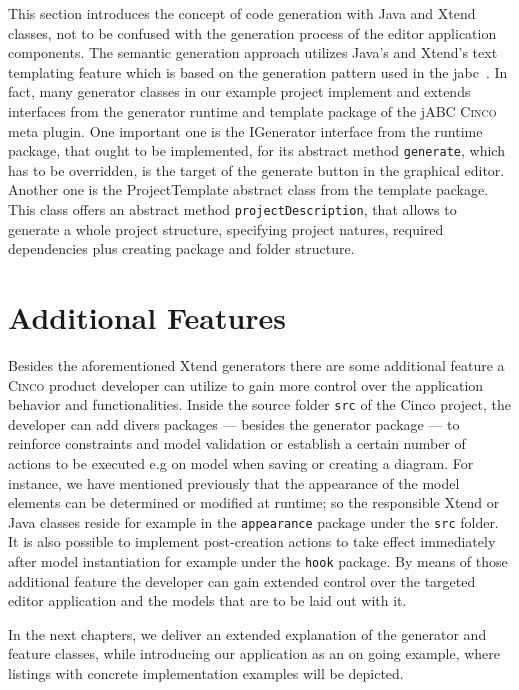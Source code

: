 This section introduces the concept of code generation with Java and Xtend classes, not to be confused with the generation process of the editor application components. The semantic generation approach utilizes Java's and Xtend's text templating feature which is based on the generation pattern used in the \acrfull{jabc}~\cite{model-driver-dev_jABC,jabc-home}. In fact, many generator classes in our example project implement and extends interfaces from the generator runtime and template package of the jABC \textsc{Cinco} meta plugin. One important one is the IGenerator interface from the runtime package, that ought to be implemented, for its abstract method \lstinline{generate}, which has to be overridden, is the target of the generate button in the graphical editor. Another one is the ProjectTemplate abstract class from the template package. This class offers an abstract method \lstinline{projectDescription}, that allows to generate a whole project structure, specifying project natures, required dependencies plus creating package and folder structure.

\section{Additional Features}

Besides the aforementioned Xtend generators there are some additional feature a \textsc{Cinco} product developer can utilize to gain more control over the application behavior and functionalities. Inside the source folder \lstinline{src} of the Cinco project, the developer can add divers packages --- besides the generator package --- to reinforce constraints and model validation or establish a certain number of actions to be executed e.g on model when saving or creating a diagram. For instance, we have mentioned previously that the appearance of the model elements can be determined or modified at runtime; so the responsible Xtend or Java classes reside for example in the \lstinline{appearance} package under the \lstinline{src} folder. It is also possible to implement post-creation actions to take effect immediately after model instantiation for example under the \lstinline{hook} package. By means of those additional feature the developer can gain extended control over the targeted editor application and the models that are to be laid out with it. 

In the next chapters, we deliver an extended explanation of the generator and feature classes, while introducing our application as an on going example, where listings with concrete implementation examples will be depicted.